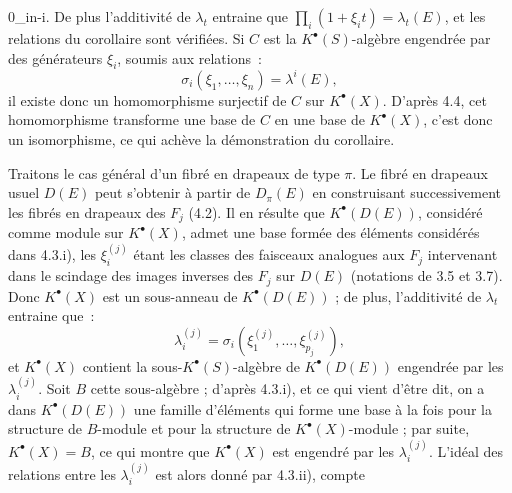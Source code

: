  0\le\alpha_i\le n-i.
\]
De plus l'additivité de \(\lambda_t\) entraine que \(\prod_i(1+\xi_i t)=\lambda_t(E)\), et les relations du corollaire sont vérifiées. Si \(C\) est la \(K^{\bullet}(S)\)-algèbre engendrée par des générateurs \(\xi_i\), soumis aux relations~:
\[
  \sigma_i(\xi_1,\ldots,\xi_n)=\lambda^i(E),
\]
il existe donc un homomorphisme surjectif de \(C\) sur \(K^{\bullet}(X)\). D'après 4.4, cet homomorphisme transforme une base de \(C\) en une base de \(K^{\bullet}(X)\), c'est donc un isomorphisme, ce qui achève la démonstration du corollaire.

Traitons le cas général d'un fibré en drapeaux de type \(\pi\). Le fibré en drapeaux usuel \(D(E)\) peut s'obtenir à partir de \(D_\pi(E)\) en construisant successivement les fibrés en drapeaux des \(F_j\) (4.2). Il en résulte que \(K^{\bullet}(D(E))\), considéré comme module sur \(K^{\bullet}(X)\), admet une base formée des éléments considérés dans 4.3.i), les \(\xi_i^{(j)}\) étant les classes des faisceaux analogues aux \(F_j\) intervenant dans le scindage des images inverses des \(F_j\) sur \(D(E)\) (notations de 3.5 et 3.7). Donc \(K^{\bullet}(X)\) est un sous-anneau de \(K^{\bullet}(D(E))\) ; de plus, l'additivité de \(\lambda_t\) entraine que~:
\[
  \lambda_i^{(j)}=\sigma_i(\xi_1^{(j)},\ldots,\xi_{p_j}^{(j)}),
\]
et \(K^{\bullet}(X)\) contient la sous-\(K^{\bullet}(S)\)-algèbre de \(K^{\bullet}(D(E))\) engendrée par les \(\lambda_i^{(j)}\). Soit \(B\) cette sous-algèbre ; d'après 4.3.i), et ce qui vient d'être dit, on a dans \(K^{\bullet}(D(E))\) une famille d'éléments qui forme une base à la fois pour la structure de \(B\)-module et pour la structure de \(K^{\bullet}(X)\)-module ; par suite, \(K^{\bullet}(X)=B\), ce qui montre que \(K^{\bullet}(X)\) est engendré par les \(\lambda_i^{(j)}\). L'idéal des relations entre les \(\lambda_i^{(j)}\) est alors donné par 4.3.ii), compte
